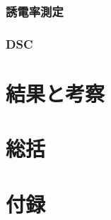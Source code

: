 \documentclass[dvipdfmx,12pt,a4paper]{jreport}
\begin{document}
			\subsection{誘電率測定}
			\subsection{DSC}
	\chapter{結果と考察}
	\chapter{総括}
	\chapter{付録}
\end{document}
